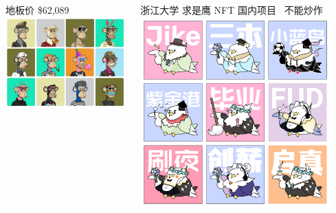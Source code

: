 \documentclass{beamer}
\begin{document}
\begin{frame}
\begin{columns}
\begin{column}{0.33\textwidth}
            地板价 \$62,089
            \includegraphics[width=\textwidth]{boredape.jpg}
        \end{column}
        \begin{column}{0.33\textwidth}
            \centering
            浙江大学 求是鹰 NFT
            国内项目 \ 不能炒作
            \includegraphics[width=0.9\textwidth]{qiushiying.png}
        \end{column}
    \end{columns}

\end{frame}
\end{document}
